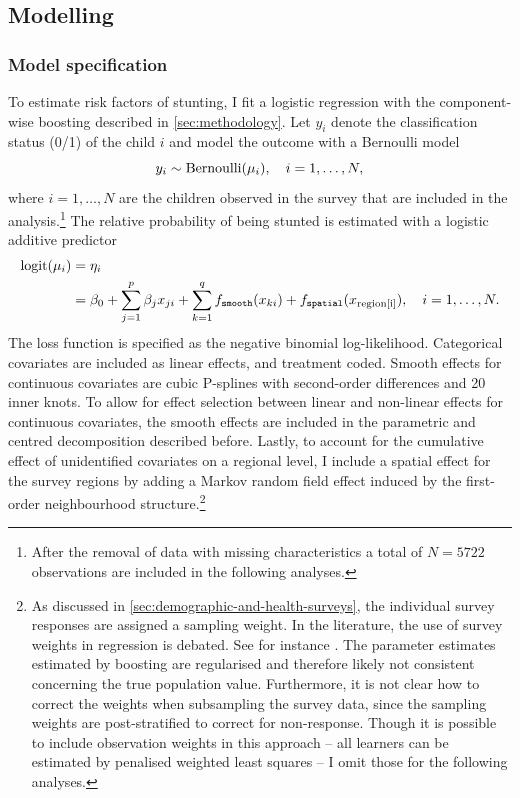 


\subsection{Modelling}

\subsubsection*{Model specification}

To estimate risk factors of stunting, I fit a logistic regression with the component-wise boosting described in \autoref{sec:methodology}. Let $y_i$ denote the classification status (0/1) of the child $i$ and model the outcome with a Bernoulli model
\begin{equation}
	y_i \sim \operatorname{Bernoulli}(\mu_i), \quad i = 1, \dots, N,
\end{equation}
where $i = 1, \dots, N$ are the children observed in the survey that are included in the analysis.\footnote{After the removal of data with missing characteristics a total of $N = 5722$ observations are included in the following analyses.} The relative probability of being stunted is estimated with a logistic additive predictor
\begin{align}\label{eq:madagascar_main}
	\begin{split}
	\operatorname{logit} (\mu_i) &= \eta_i\\
	&= \beta_0 + \sum_{j = 1}^{p} \beta_j x_{ji} + \sum_{k = 1}^{q} f_{\mathtt{smooth}} (x_{ki}) + f_{\mathtt{spatial}} (x_{\text{region[i]}}), \quad i = 1, \dots, N.
	\end{split}
\end{align}
The loss function is specified as the negative binomial log-likelihood. Categorical covariates are included as linear effects, and treatment coded. Smooth effects for continuous covariates are cubic P-splines with second-order differences and 20 inner knots. To allow for effect selection between linear and non-linear effects for continuous covariates, the smooth effects are included in the parametric and centred decomposition described before. Lastly, to account for the cumulative effect of unidentified covariates on a regional level, I include a spatial effect for the survey regions by adding a Markov random field effect induced by the first-order neighbourhood structure.\footnote{As discussed in \autoref{sec:demographic-and-health-surveys}, the individual survey responses are assigned a sampling weight. In the literature, the use of survey weights in regression is debated. See for instance \textcite{winshipSamplingWeightsRegression1994, gelmanStrugglesSurveyWeighting2007}. The parameter estimates estimated by boosting are regularised and therefore likely not consistent concerning the true population value. Furthermore, it is not clear how to correct the weights when subsampling the survey data, since the sampling weights are post-stratified to correct for non-response. Though it is possible to include observation weights in this approach -- all learners can be estimated by penalised weighted least squares -- I omit those for the following analyses.}

